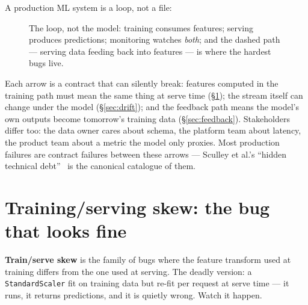 A production ML system is a loop, not a file:

\begin{figure}[htbp]
\centering
{}
\caption{The loop, not the model: training consumes features; serving
produces predictions; monitoring watches \emph{both}; and the dashed
path --- serving data feeding back into features --- is where the
hardest bugs live.}
\label{fig:system}
\end{figure}

Each arrow is a contract that can silently break: features computed
in the training path must mean the same thing at serve time
(\S\ref{sec:skew}); the stream itself can change under the model
(\S\ref{sec:drift}); and the feedback path means the model's own
outputs become tomorrow's training data (\S\ref{sec:feedback}).
Stakeholders differ too: the data owner cares about schema, the
platform team about latency, the product team about a metric the
model only proxies. Most production failures are contract failures
between these arrows --- Sculley et al.'s ``hidden technical
debt''~\cite{hiddendebt} is the canonical catalogue of them.

\section{Training/serving skew: the bug that looks fine}
\label{sec:skew}

\textbf{Train/serve skew} is the family of
bugs where the feature transform used at training differs from the
one used at serving. The deadly version: a \texttt{StandardScaler}
fit on training data but re-fit per request at serve time --- it runs,
it returns predictions, and it is quietly wrong. Watch it happen.

